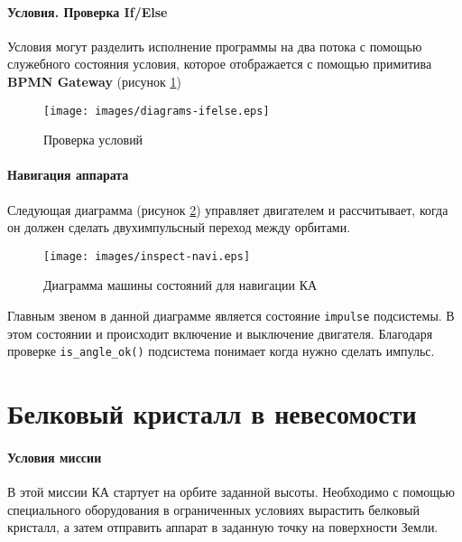 \documentclass[12pt,a4paper]{article}
\begin{document}
\clearpage

\paragraph{Условия. Проверка If/Else}Условия могут разделить исполнение программы на два потока с помощью служебного состояния условия, которое отображается с помощью примитива \textbf{BPMN Gateway} (рисунок \ref{Pic:IfElse})

\begin{figure}[tbh]
  \begin{center}
    \texttt{[image: images/diagrams-ifelse.eps]}
    \caption{Проверка условий}
    \label{Pic:IfElse}
  \end{center}
\end{figure}

\paragraph{Навигация аппарата} Следующая диаграмма (рисунок \ref{Pic:INSPECT-navi}) управляет двигателем и рассчитывает, когда он должен сделать двухимпульсный переход между орбитами.

\begin{figure}[tbh]
  \begin{center}
    \texttt{[image: images/inspect-navi.eps]}
    \caption{Диаграмма машины состояний для навигации КА}
    \label{Pic:INSPECT-navi}
  \end{center}
\end{figure}

Главным звеном в данной диаграмме является состояние \verb'impulse' подсистемы. В этом состоянии и происходит включение и выключение двигателя. Благодаря проверке \verb'is_angle_ok()' подсистема понимает когда нужно сделать импульс.

\section{Белковый кристалл в невесомости}

\paragraph{Условия миссии} В этой миссии КА стартует на орбите
заданной высоты. Необходимо с помощью специального оборудования в ограниченных условиях вырастить белковый кристалл, а затем отправить аппарат в заданную точку на поверхности Земли.
\end{document}
